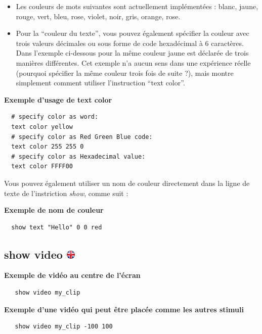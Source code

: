 \documentclass[
]{book}
\providecommand{\tightlist}{%
  \setlength{\itemsep}{0pt}\setlength{\parskip}{0pt}}
\begin{document}
\begin{itemize}
\tightlist
\item
  Les couleurs de mots suivantes sont actuellement implémentées : blanc, jaune, rouge, vert, bleu, rose, violet, noir, gris, orange, rose.
\item
  Pour la ``couleur du texte'', vous pouvez également spécifier la couleur avec trois valeurs décimales ou sous forme de code hexadécimal à 6 caractères. Dans l'exemple ci-dessous pour la même couleur jaune est déclarée de trois manières différentes. Cet exemple n'a aucun sens dans une expérience réelle (pourquoi spécifier la même couleur trois fois de suite ?), mais montre simplement comment utiliser l'instruction ``text color''.
\end{itemize}

\textbf{Exemple d'usage de text color}

\begin{verbatim}
  # specify color as word:
  text color yellow
  # specify color as Red Green Blue code:
  text color 255 255 0
  # specify color as Hexadecimal value:
  text color FFFF00
\end{verbatim}

Vous pouvez également utiliser un nom de couleur directement dans la ligne de texte de l'instriction \emph{show}, comme suit :

\textbf{Exemple de nom de couleur}

\begin{verbatim}
  show text "Hello" 0 0 red
\end{verbatim}

\hypertarget{show-video}{%
\subsection[show video ]{\texorpdfstring{show video \href{https://www.psytoolkit.org/doc3.4.0/syntax.html\#task-show-video}{\protect\includegraphics{img/ukflag.png}}}{show video }}\label{show-video}}

\textbf{Exemple de vidéo au centre de l'écran}

\begin{verbatim}
   show video my_clip
\end{verbatim}

\textbf{Exemple d'une vidéo qui peut être placée comme les autres stimuli}

\begin{verbatim}
   show video my_clip -100 100
\end{verbatim}
\end{document}
